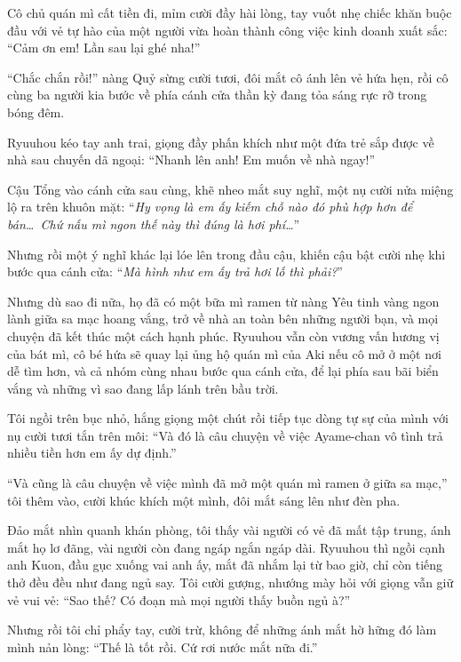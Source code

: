 \documentclass[../main.tex]{subfiles}
\begin{document}
Cô chủ quán mì cất tiền đi, mỉm cười đầy hài lòng, tay vuốt nhẹ chiếc khăn buộc đầu với vẻ tự hào của một người vừa hoàn thành công việc kinh doanh xuất sắc: ``Cảm ơn em! Lần sau lại ghé nha!''

``Chắc chắn rồi!'' nàng Quỷ sừng cười tươi, đôi mắt cô ánh lên vẻ hứa hẹn, rồi cô cùng ba người kia bước về phía cánh cửa thần kỳ đang tỏa sáng rực rỡ trong bóng đêm.

Ryuuhou kéo tay anh trai, giọng đầy phấn khích như một đứa trẻ sắp được về nhà sau chuyến dã ngoại: ``Nhanh lên anh! Em muốn về nhà ngay!''

Cậu Tổng vào cánh cửa sau cùng, khẽ nheo mắt suy nghĩ, một nụ cười nửa miệng lộ ra trên khuôn mặt: ``\textit{Hy vọng là em ấy kiếm chỗ nào đó phù hợp hơn để bán\dots\ Chứ nấu mì ngon thế này thì đúng là hơi phí\dots}''

Nhưng rồi một ý nghĩ khác lại lóe lên trong đầu cậu, khiến cậu bật cười nhẹ khi bước qua cánh cửa: ``\textit{Mà hình như em ấy trả hơi lố thì phải?}''

Nhưng dù sao đi nữa, họ đã có một bữa mì ramen từ nàng Yêu tinh vàng ngon lành giữa sa mạc hoang vắng, trở về nhà an toàn bên những người bạn, và mọi chuyện đã kết thúc một cách hạnh phúc. Ryuuhou vẫn còn vương vấn hương vị của bát mì, cô bé hứa sẽ quay lại ủng hộ quán mì của Aki nếu cô mở ở một nơi dễ tìm hơn, và cả nhóm cùng nhau bước qua cánh cửa, để lại phía sau bãi biển vắng và những vì sao đang lấp lánh trên bầu trời.

\ct


Tôi ngồi trên bục nhỏ, hắng giọng một chút rồi tiếp tục dòng tự sự của mình với nụ cười tươi tắn trên môi: ``Và đó là câu chuyện về việc Ayame-chan vô tình trả nhiều tiền hơn em ấy dự định.''


``Và cũng là câu chuyện về việc mình đã mở một quán mì ramen ở giữa sa mạc,'' tôi thêm vào, cười khúc khích một mình, đôi mắt sáng lên như đèn pha.

Đảo mắt nhìn quanh khán phòng, tôi thấy vài người có vẻ đã mất tập trung, ánh mắt họ lơ đãng, vài người còn đang ngáp ngắn ngáp dài. Ryuuhou thì ngồi cạnh anh Kuon, đầu gục xuống vai anh ấy, mắt đã nhắm lại từ bao giờ, chỉ còn tiếng thở đều đều như đang ngủ say. Tôi cười gượng, nhướng mày hỏi với giọng vẫn giữ vẻ vui vẻ: ``Sao thế? Có đoạn mà mọi người thấy buồn ngủ à?''

Nhưng rồi tôi chỉ phẩy tay, cười trừ, không để những ánh mắt hờ hững đó làm mình nản lòng: ``Thế là tốt rồi. Cứ rơi nước mắt nữa đi.''
\end{document}
